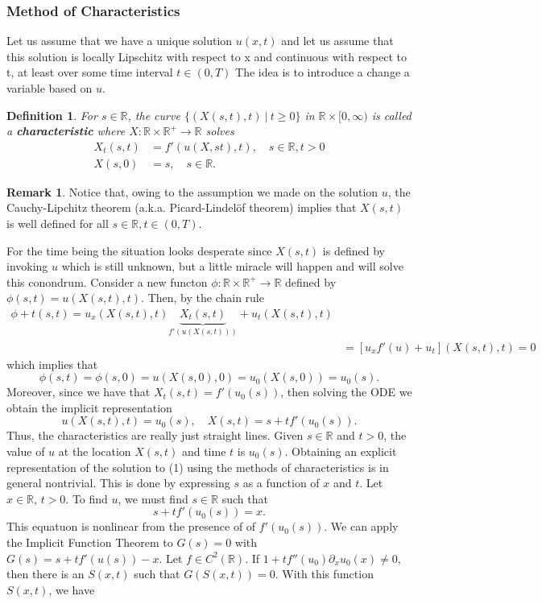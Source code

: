 \documentclass{article}
\newtheorem{definition}[theorem]{Definition}
\theoremstyle{definition}
\theoremstyle{definition}
\newtheorem{remark}[theorem]{Remark}
\newcommand{\R}{\mathbb{R}}
\begin{document}
\subsubsection{Method of Characteristics}
Let us assume that we have a unique solution $u(x, t)$ and let us assume that this
solution is locally Lipschitz with respect to x and continuous with respect to t, at
least over some time interval $t\in (0,T)$
The idea is to introduce a change a variable
based on $u$.
\begin{definition}
    For $s\in \R$, the curve $\{(X(s,t),t)\:|\:t\geq 0\}$ in $\R\times [0,\infty)$ is called a \textbf{characteristic} where $X:\R\times \R^+\to \R$ solves
    \begin{align*}
        X_t(s,t)&=f'(u(X,st),t),\quad s\in \R,t>0 \\
        X(s,0)&=s,\quad s\in \R.
    \end{align*}
\end{definition}
\begin{remark}
    Notice that, owing to the assumption we made on the solution $u$, the Cauchy-Lipchitz
theorem (a.k.a. Picard-Lindelöf theorem) implies that $X(s, t)$ is well defined for all $s\in \R,t\in (0,T)$.
\end{remark}
For the time being the situation looks desperate since
$X(s, t)$ is defined by invoking $u$ which is still unknown, but a little miracle will
happen and will solve this conondrum. Consider a new functon $\phi:\R\times \R^+\to \R$ defined by $\phi(s,t)=u(X(s,t),t)$. Then, by the chain rule
\begin{align*}
    \phi+t(s,t)=u_{x}(X(s,t),t)\underbrace{X_t(s,t)}_{f'(u(X(s,t)))}+u_t(X(s,t),t) \\
    &=[u_xf'(u)+u_t](X(s,t),t)=0
\end{align*}
which implies that
$$\phi(s,t)=\phi(s,0)=u(X(s,0),0)=u_0(X(s,0))=u_0(s).$$
Moreover, since we have that $X_t(s,t)=f'(u_0(s))$, then solving the ODE we obtain the implicit representation
$$u(X(s,t),t)=u_0(s),\quad X(s,t)=s+tf'(u_0(s)).$$
Thus, the characteristics are really just straight lines. Given $s\in \R$ and $t>0$, the value of $u$ at the location $X(s,t)$ and time $t$ is $u_0(s)$.
Obtaining an explicit representation of the solution to (1) using the methods of
characteristics is in general nontrivial. This is done by expressing $s$ as a function of
$x$ and $t$. Let $x\in \R$, $t>0$. To find $u$, we must find $s\in \R$ such that
$$s+tf'(u_0(s))=x.$$
This equatuon is nonlinear from the presence of of $f'(u_0(s))$. We can apply the Implicit Function Theorem to $G(s)=0$ with $G(s)=s+tf'(u(s))-x$. Let $f\in C^2(\R)$. If $1+tf''(u_0)\partial_{x}u_0(x)\neq 0$, then there is an $S(x,t)$ such that $G(S(x,t))=0$. With this function $S(x,t)$, we have
\end{document}
